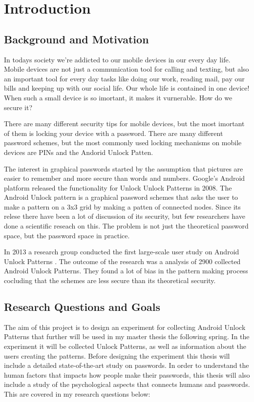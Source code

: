 \chapter{Introduction}

\section{Background and Motivation}
    
  In todays society we're addicted to our mobile devices in our every day life. Mobile devices are not just a communication tool for calling and texting, but also an important tool for every day tasks like doing our work, reading mail, pay our bills and keeping up with our social life. Our whole life is contained in one device! When such a small device is so imortant, it makes it vurnerable. How do we secure it?

  There are many different security tips for mobile devices, but the most imortant of them is locking your device with a password. There are many different password schemes, but the most commonly used locking mechanisms on mobile devices are PINs and the Andorid Unlock Patten.

  The interest in graphical passwords started by the assumption that pictures are easier to remember and more secure than words and numbers. Google's Android platform released the  functionality for Unlock Unlock Patterns in 2008. The Android Unlock pattern is a graphical password schemes that asks the user to make a pattern on a 3x3 grid by making a patten of connected nodes. Since its relese there have been a lot of discussion of its security, but few researchers have done a scientific reseach on this. The problem is not just the theoretical password space, but the password space in practice.

  In 2013 a research group conducted the first large-scale user study on Android Unlock Patterns \cite{Uellenbeck}. The outcome of the research was a analysis of 2900 collected Android Unlock Patterns. They found a lot of bias in the pattern making process cocluding that the schemes are less secure than its theoretical security.

\clearpage
\section{Research Questions and Goals}

  The aim of this project is to design an experiment for collecting Android Unlock Patterns that further will be used in my master thesis the following spring. In the experiment it will be collected Unlock Patterns, as well as information about the users creating the patterns. Before designing the experiment this thesis will include a detailed state-of-the-art study on passwords. In order to understand the human factors that impacts how people make their passwords, this thesis will also include a study of the psychological aspects that connects humans and passwords. This are covered in my research questions below:

